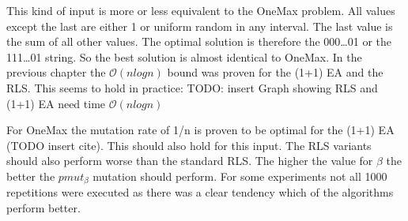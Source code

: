 This kind of input is more or less equivalent to the OneMax problem. All values except the last are either 1 or uniform
random in any interval. The last value is the sum of all other values. The optimal solution is therefore the 000\dots01 or
the 111\dots01 string. So the best solution is almost identical to OneMax. In the previous chapter the $\mathcal{O}(nlogn)$ bound was
proven for the (1+1) EA and the RLS. This seems to hold in practice:
TODO: insert Graph showing RLS and (1+1) EA need time $\mathcal{O}(nlogn)$

For OneMax the mutation rate of 1/n is proven to be optimal for the (1+1) EA (TODO insert cite).
This should also hold for this input. The RLS variants should also perform worse than the standard RLS.
The higher the value for $\beta$ the better the $pmut_\beta$ mutation should perform.
For some experiments not all 1000 repetitions were executed as there was a clear tendency which of the algorithms perform better.
